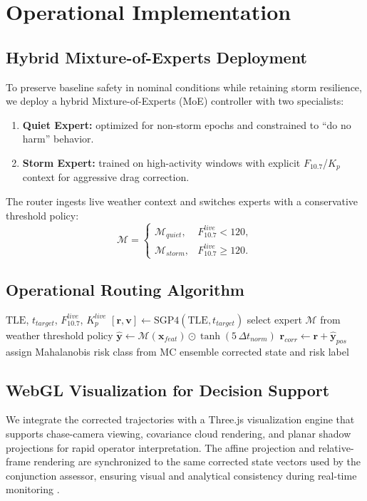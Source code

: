 \section{Operational Implementation}\label{sec:ops}

\subsection{Hybrid Mixture-of-Experts Deployment}
To preserve baseline safety in nominal conditions while retaining storm resilience, we deploy a hybrid Mixture-of-Experts (MoE) controller with two specialists:
\begin{enumerate}
    \item \textbf{Quiet Expert:} optimized for non-storm epochs and constrained to ``do no harm'' behavior.
    \item \textbf{Storm Expert:} trained on high-activity windows with explicit $F_{10.7}$/$K_p$ context for aggressive drag correction.
\end{enumerate}
The router ingests live weather context and switches experts with a conservative threshold policy:
\begin{equation}
\mathcal{M} =
\begin{cases}
\mathcal{M}_{quiet}, & F_{10.7}^{live} < 120,\\
\mathcal{M}_{storm}, & F_{10.7}^{live} \ge 120.
\end{cases}
\end{equation}

\subsection{Operational Routing Algorithm}
\begin{algorithm}[H]
\caption{Hybrid SpOC Routing}
\begin{algorithmic}[1]
\REQUIRE $\mathrm{TLE}$, $t_{target}$, $F_{10.7}^{live}$, $K_p^{live}$
\STATE $[\mathbf{r},\mathbf{v}] \leftarrow \mathrm{SGP4}(\mathrm{TLE}, t_{target})$
\STATE select expert $\mathcal{M}$ from weather threshold policy
\STATE $\hat{\mathbf{y}} \leftarrow \mathcal{M}(\mathbf{x}_{feat}) \odot \tanh(5\,\Delta t_{norm})$
\STATE $\mathbf{r}_{corr} \leftarrow \mathbf{r} + \hat{\mathbf{y}}_{pos}$
\STATE assign Mahalanobis risk class from MC ensemble
\RETURN corrected state and risk label
\end{algorithmic}
\end{algorithm}

\subsection{WebGL Visualization for Decision Support}
We integrate the corrected trajectories with a Three.js visualization engine that supports chase-camera viewing, covariance cloud rendering, and planar shadow projections for rapid operator interpretation. The affine projection and relative-frame rendering are synchronized to the same corrected state vectors used by the conjunction assessor, ensuring visual and analytical consistency during real-time monitoring \cite{rommel2025verifiable,ramesh2025space}.
